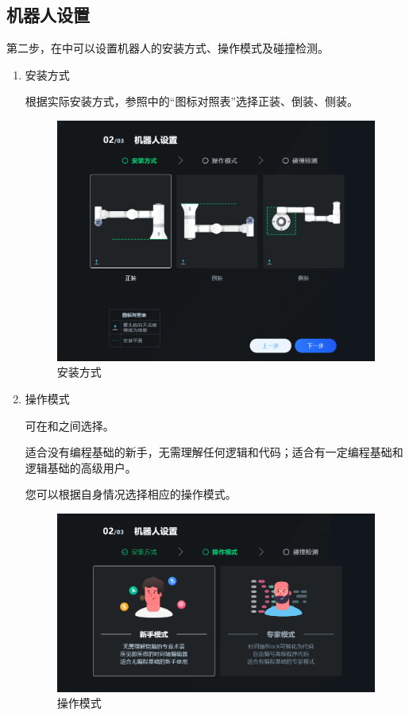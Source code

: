 \subsection{机器人设置}
第二步，在中可以设置机器人的安装方式、操作模式及碰撞检测。
\begin{enumerate}
\item 安装方式

	根据实际安装方式，参照中的“图标对照表”选择正装、倒装、侧装。

	\begin{figure}[ht]
		\centering
		\includegraphics[width=\textwidth]{screen/2-6.png}
		\caption{安装方式}
		\label{fig:安装方式}
	\end{figure}



\item 操作模式

	可在和之间选择。
	
	适合没有编程基础的新手，无需理解任何逻辑和代码；适合有一定编程基础和逻辑基础的高级用户。
	
	您可以根据自身情况选择相应的操作模式。

	\begin{figure}[ht]
		\centering
		\includegraphics[width=\textwidth]{screen/2-7.png}
		\caption{操作模式}
		\label{fig:操作模式}
	\end{figure}


\end{enumerate}
